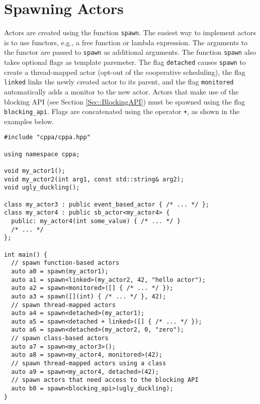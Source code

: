 \section{Spawning Actors}

Actors are created using the function \lstinline^spawn^.
The easiest way to implement actors is to use functors, e.g., a free function or lambda expression.
The arguments to the functor are passed to \lstinline^spawn^ as additional arguments.
The function \lstinline^spawn^ also takes optional flags as template paremeter.
The flag \lstinline^detached^ causes \lstinline^spawn^ to create a thread-mapped actor (opt-out of the cooperative scheduling), the flag \lstinline^linked^ links the newly created actor to its parent, and the flag \lstinline^monitored^ automatically adds a monitor to the new actor.
Actors that make use of the blocking API (see Section \ref{Sec::BlockingAPI}) must be spawned using the flag \lstinline^blocking_api^.
Flags are concatenated using the operator \lstinline^+^, as shown in the examples below.

\begin{lstlisting}
#include "cppa/cppa.hpp"

using namespace cppa;

void my_actor1();
void my_actor2(int arg1, const std::string& arg2);
void ugly_duckling();

class my_actor3 : public event_based_actor { /* ... */ };
class my_actor4 : public sb_actor<my_actor4> {
  public: my_actor4(int some_value) { /* ... */ }
  /* ... */
};

int main() {
  // spawn function-based actors
  auto a0 = spawn(my_actor1);
  auto a1 = spawn<linked>(my_actor2, 42, "hello actor");
  auto a2 = spawn<monitored>([] { /* ... */ });
  auto a3 = spawn([](int) { /* ... */ }, 42);
  // spawn thread-mapped actors
  auto a4 = spawn<detached>(my_actor1);
  auto a5 = spawn<detached + linked>([] { /* ... */ });
  auto a6 = spawn<detached>(my_actor2, 0, "zero");
  // spawn class-based actors
  auto a7 = spawn<my_actor3>();
  auto a8 = spawn<my_actor4, monitored>(42);
  // spawn thread-mapped actors using a class
  auto a9 = spawn<my_actor4, detached>(42);
  // spawn actors that need access to the blocking API
  auto b0 = spawn<blocking_api>(ugly_duckling);
}
\end{lstlisting}

